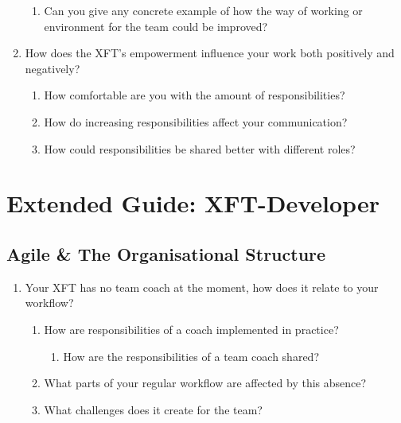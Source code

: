 \begin{enumerate}
\begin{enumerate}
     \item Can you give any concrete example of how the way of working or environment for the team could be improved?
  \end{enumerate}
  
  \item How does the XFT’s empowerment influence your work both positively and negatively?
  
     \begin{enumerate}
         \item How comfortable are you with the amount of responsibilities?
         \item How do increasing responsibilities affect your communication?
         \item How could responsibilities be shared better with different roles?
     \end{enumerate}
\end{enumerate}

\section*{Extended Guide: XFT-Developer}

\subsection*{Agile \& The Organisational Structure}

\begin{enumerate}
   \item Your XFT has no team coach at the moment, how does it relate to your workflow?
    
       \begin{enumerate}
            \item How are responsibilities of a coach implemented in practice?
          
             \begin{enumerate}
                \item How are the responsibilities of a team coach shared?
              \end{enumerate}
          
            \item What parts of your regular workflow are affected by this absence?
            \item What challenges does it create for the team?
        \end{enumerate}
\end{enumerate}

